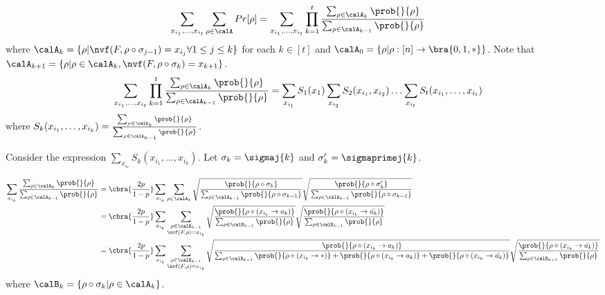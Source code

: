     \begin{align*}
        \sum_{x_{i_1}, \ldots ,x_{i_t}}\sum_{\rho \in \calA} Pr[\rho]
        &= \sum_{x_{i_1}, \ldots ,x_{i_t}} \prod_{k=1}^{t} \frac{\sum_{\rho \in \calA_{k}}\prob{}{\rho}}{\sum_{\rho \in \calA_{k-1}}\prob{}{\rho}}
    \end{align*}
where $\calA_k = \nvfcondsk{k}$ for each $k \in [t]$ and $\calA_0 = \{\rho| \rho: [n] \to \bra{0,1,*} \}$.
Note that $\calA_{k+1} = \{ \rho| \rho \in \calA_k , \nvf(F,\rho \circ \sigma_k) = x_{k+1} \}$. 
    \begin{align*}
        \sum_{x_{i_1}, \ldots ,x_{i_t}} \prod_{k=1}^{t} \frac{\sum_{\rho \in \calA_{k}}\prob{}{\rho}}{\sum_{\rho \in \calA_{k-1}}\prob{}{\rho}}
        &= \sum_{x_{i_1}} S_1(x_1) \sum_{x_{i_2}} S_2(x_{i_1},x_{i_2}) \ldots \sum_{x_{i_t}}S_t(x_{i_1},\ldots , x_{i_t})
    \end{align*}
    where $S_k(x_{i_1}, \ldots , x_{i_k}) = \frac{\sum_{\rho \in \calA_{k}}\prob{}{\rho}}{\sum_{\rho \in \calA_{k-1}}\prob{}{\rho}} $.
    
    Consider the expression $\sum_{x_{i_k}} S_k(x_{i_1}, \ldots , x_{i_k})$. Let $\sigma_k = \sigmaj{k}$ and $\sigma_k' = \sigmaprimej{k}$.


    \begin{align*}
        \sum_{x_{i_k}} \frac{\sum_{\rho \in \calA_{k}}\prob{}{\rho}}{\sum_{\rho \in \calA_{k-1}}\prob{}{\rho}}
        &=\cbra{\frac{2p}{1-p}}\sum_{x_{i_k}} \sum_{\rho \in \calA_k} \sqrt{\frac{\prob{}{\rho\circ \sigma_k}}{\sum_{\rho \in \calA_{k-1}}\prob{}{\rho\circ \sigma_{k-1}}}} \sqrt{\frac{\prob{}{\rho\circ \sigma_k'}}{\sum_{\rho \in \calA_{k-1}}\prob{}{\rho\circ \sigma_{k-1}}}}\\         
        &= \cbra{\frac{2p}{1-p}}\sum_{x_{i_k}} \sum_{ \substack{\rho \in \calB_{k-1} \\ \nvf(F,\rho) = x_{i_k}} }  \sqrt{\frac{\prob{}{\rho\circ (x_{i_k} \to a_k)}}{\sum_{\rho \in \calB_{k-1}}\prob{}{\rho}}} \sqrt{\frac{\prob{}{\rho\circ (x_{i_k} \to \bar{a_k})}}{\sum_{\rho \in \calB_{k-1}}\prob{}{\rho}}}\\
        &= \cbra{\frac{2p}{1-p}}\sum_{x_{i_k}} \sum_{ \substack{\rho \in \calB_{k-1} \\ \nvf(F,\rho) = x_{i_k}} }  \sqrt{\frac{\prob{}{\rho\circ (x_{i_k} \to a_k)}}{\sum_{\rho \in \calB_{k-1}}\prob{}{\rho\circ (x_{i_k} \to *)}+\prob{}{\rho\circ (x_{i_k} \to a_k)}+\prob{}{\rho\circ (x_{i_k} \to \bar{a_k})}}} \sqrt{\frac{\prob{}{\rho\circ (x_{i_k} \to \bar{a_k})}}{\sum_{\rho \in \calB_{k-1}}\prob{}{\rho}}}\\
    \end{align*}
    where $\calB_k = \{ \rho \circ \sigma_k | \rho \in \calA_k\}$.\\

